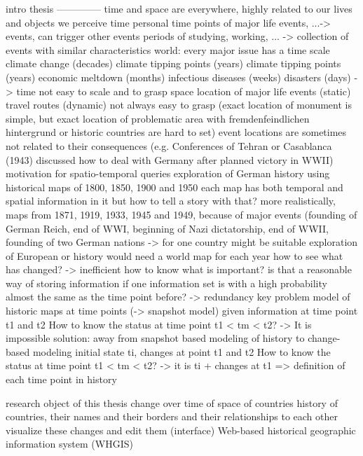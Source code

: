 intro thesis
--------------
time and space are everywhere, highly related to our lives and objects we perceive
time
  personal
    time points of major life events, ...-> events, can trigger other events
    periods of studying, working, ... -> collection of events with similar characteristics
  world: every major issue has a time scale
    climate change (decades)
    climate tipping points (years) climate tipping points (years)
    economic meltdown (months)
    infectious diseases (weeks)
    disasters (days)
  -> time not easy to scale and to grasp
space
  location of major life events (static)
  travel routes (dynamic)
  not always easy to grasp (exact location of monument is simple, but exact location of problematic area with fremdenfeindlichen hintergrund or historic countries are hard to set)
  event locations are sometimes not related to their consequences (e.g. Conferences of Tehran or Casablanca (1943) discussed how to deal with Germany after planned victory in WWII)
motivation for spatio-temporal queries
  exploration of German history using historical maps of 1800, 1850, 1900 and 1950
    each map has both temporal and spatial information in it
    but how to tell a story with that?
    more realistically, maps from 1871, 1919, 1933, 1945 and 1949, because of major events (founding of German Reich, end of WWI, beginning of Nazi dictatorship, end of WWII, founding of two German nations
    -> for one country might be suitable
  exploration of European or history
    would need a world map for each year
    how to see what has changed? -> inefficient
    how to know what is important?
    is that a reasonable way of storing information if one information set is with a high probability almost the same as the time point before? -> redundancy
  key problem
    model of historic maps at time points (-> snapshot model)
    given information at time point t1 and t2
    How to know the status at time point t1 < tm < t2?
    -> It is impossible
  solution: away from snapshot based modeling of history to change-based modeling
    initial state ti, changes at point t1 and t2
    How to know the status at time point t1 < tm < t2?
    -> it is ti + changes at t1
    => definition of each time point in history

research object of this thesis
  change over time of space of countries
  history of countries, their names and their borders and their relationships to each other
  visualize these changes and edit them (interface)
  Web-based historical geographic information system (WHGIS)

